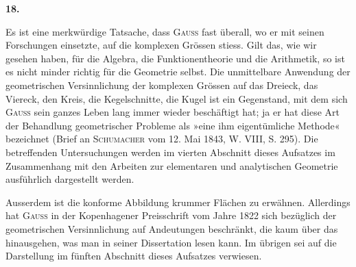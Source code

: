 \clearpage\begingroup{}
\renewcommand{\thefootnote}{\arabic{footnote})}\setcounter{footnote}{1}
\begin{center}
\textbf{18.}\par\smallskip
{}
\end{center}
\noindent\hspace*{\parindent}Es ist eine merkwürdige Tatsache, dass \textsc{Gauss} fast überall, wo er mit
seinen Forschungen einsetzte, auf die komplexen Grössen stiess. Gilt das,
wie wir gesehen haben, für die Algebra, die Funktionentheorie und die Arithmetik,
so ist es nicht minder richtig für die Geometrie selbst.
\clearpage{}\setcounter{footnote}{0}
\noindent\hspace*{\parindent}Die unmittelbare Anwendung der geometrischen Versinnlichung der komplexen
Grössen auf das Dreieck, das Viereck, den Kreis, die Kegelschnitte,
die Kugel ist ein Gegenstand, mit dem sich \textsc{Gauss} sein ganzes Leben lang
immer wieder beschäftigt hat; ja er hat diese Art der Behandlung geometrischer
Probleme als »eine ihm eigentümliche Methode« bezeichnet (Brief an
\textsc{Schumacher} vom 12. Mai 1843, W. VIII, S. 295). Die betreffenden Untersuchungen
werden im vierten Abschnitt dieses Aufsatzes im Zusammenhang
mit den Arbeiten zur elementaren und analytischen Geometrie ausführlich
dargestellt werden.
\par
Ausserdem ist die konforme Abbildung krummer Flächen zu erwähnen.
Allerdings hat \textsc{Gauss} in der Kopenhagener Preisschrift vom Jahre 1822 sich
bezüglich der geometrischen Versinnlichung auf Andeutungen beschränkt, die
kaum über das hinausgehen, was man in seiner Dissertation lesen kann. Im
übrigen sei auf die Darstellung im fünften Abschnitt dieses Aufsatzes verwiesen.
\clearpage\endgroup

